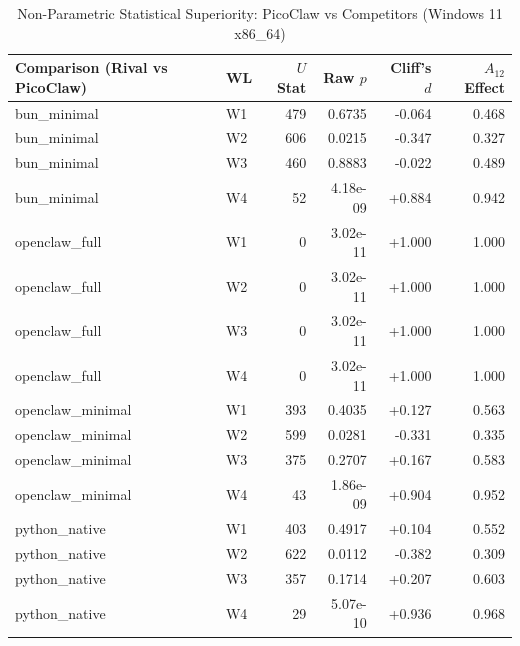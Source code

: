 \begin{table}[t]
\centering\small
\caption{Non-Parametric Statistical Superiority: PicoClaw vs Competitors (Windows 11 x86_64)}
\label{tab:Windows_stat_tests}
\begin{tabular}{llrrrr}
\toprule
Comparison (Rival vs PicoClaw) & WL & $U$ Stat & Raw $p$ & Cliff's $d$ & $A_{12}$ Effect \\
\midrule
bun\_minimal & W1 & 479 & 0.6735 & -0.064 & 0.468 \\
bun\_minimal & W2 & 606 & 0.0215 & -0.347 & 0.327 \\
bun\_minimal & W3 & 460 & 0.8883 & -0.022 & 0.489 \\
bun\_minimal & W4 & 52 & 4.18e-09 & +0.884 & 0.942 \\
openclaw\_full & W1 & 0 & 3.02e-11 & +1.000 & 1.000 \\
openclaw\_full & W2 & 0 & 3.02e-11 & +1.000 & 1.000 \\
openclaw\_full & W3 & 0 & 3.02e-11 & +1.000 & 1.000 \\
openclaw\_full & W4 & 0 & 3.02e-11 & +1.000 & 1.000 \\
openclaw\_minimal & W1 & 393 & 0.4035 & +0.127 & 0.563 \\
openclaw\_minimal & W2 & 599 & 0.0281 & -0.331 & 0.335 \\
openclaw\_minimal & W3 & 375 & 0.2707 & +0.167 & 0.583 \\
openclaw\_minimal & W4 & 43 & 1.86e-09 & +0.904 & 0.952 \\
python\_native & W1 & 403 & 0.4917 & +0.104 & 0.552 \\
python\_native & W2 & 622 & 0.0112 & -0.382 & 0.309 \\
python\_native & W3 & 357 & 0.1714 & +0.207 & 0.603 \\
python\_native & W4 & 29 & 5.07e-10 & +0.936 & 0.968 \\
\bottomrule
\end{tabular}
\end{table}
